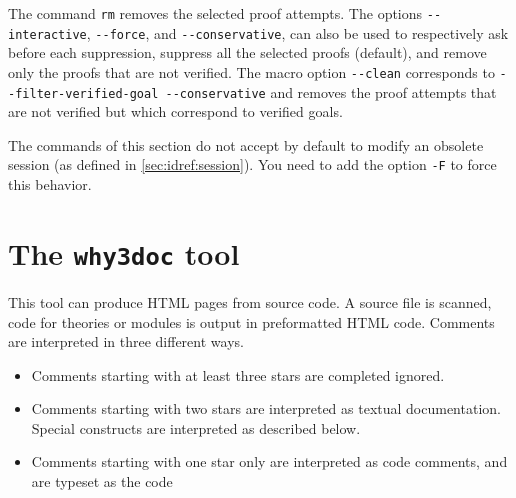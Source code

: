 The command \texttt{rm} removes the selected proof
attempts. The options \verb|--interactive|, \verb|--force|, and
\verb|--conservative|, can also be used to respectively ask before
each suppression, suppress all the selected proofs (default), and remove
only the proofs that are not verified. The macro option \verb|--clean|
corresponds to \verb|--filter-verified-goal --conservative| and
removes the proof attempts that are not verified but which correspond
to verified goals.

The commands of this section do not accept by default to modify an
obsolete session (as defined in \ref{sec:idref:session}). You need to
add the option \verb|-F| to force this behavior.






\section{The \texttt{why3doc} tool}
\label{sec:why3doc}

This tool can produce HTML pages from \why source code. A source file
is scanned, \why code for theories or modules is output in
preformatted HTML code. Comments are interpreted in three different ways.
\begin{itemize}
\item Comments starting with at least three stars are completed
  ignored.
\item Comments starting with two stars are interpreted as textual
  documentation. Special constructs are interpreted as described
  below.
\item Comments starting with one star only are interpreted as code
  comments, and are typeset as the code
\end{itemize}

